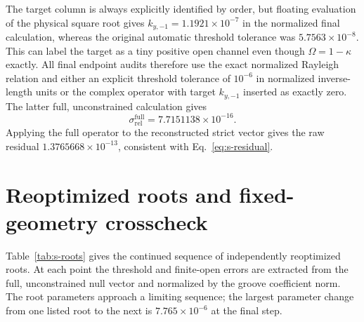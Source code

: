 \documentclass[aps,prl,reprint,superscriptaddress,nofootinbib,floatfix]{revtex4-2}
\begin{document}
The target column is always explicitly identified by order, but floating
evaluation of the physical square root gives
$k_{y,-1}=1.1921\times10^{-7}$ in the normalized final calculation, whereas
the original automatic threshold tolerance was
$5.7563\times10^{-8}$.  This can label the target as a tiny positive open
channel even though $\Omega=1-\kappa$ exactly.  All final endpoint audits
therefore use the exact normalized Rayleigh relation and either an explicit
threshold tolerance of $10^{-6}$ in normalized inverse-length units or the
complex operator with target $k_{y,-1}$ inserted as exactly zero.  The latter
full, unconstrained calculation gives
\begin{equation}
 \sigma_{\mathrm{rel}}^{\mathrm{full}}
 =7.7151138\times10^{-16}.                                             \label{eq:s-full-endpoint}
\end{equation}
Applying the full operator to the reconstructed strict vector gives the raw
residual $1.3765668\times10^{-13}$, consistent with
Eq.~\eqref{eq:s-residual}.

\section{Reoptimized roots and fixed-geometry crosscheck}

Table~\ref{tab:s-roots} gives the continued sequence of independently
reoptimized roots.  At each point the threshold and finite-open errors are
extracted from the full, unconstrained null vector and normalized by the
groove coefficient norm.  The root parameters approach a limiting sequence;
the largest parameter change from one listed root to the next is
$7.765\times10^{-6}$ at the final step.
\end{document}
